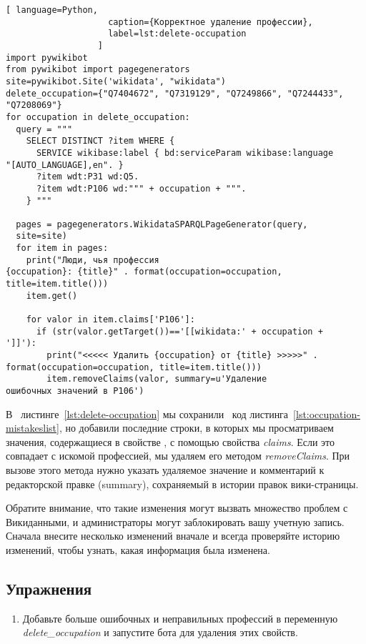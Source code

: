 \begin{lstlisting}[ language=Python,
                    caption={Корректное удаление профессии},
                    label=lst:delete-occupation
                  ]
import pywikibot
from pywikibot import pagegenerators
site=pywikibot.Site('wikidata', "wikidata")
delete_occupation={"Q7404672", "Q7319129", "Q7249866", "Q7244433", 
"Q7208069"}
for occupation in delete_occupation:
  query = """
    SELECT DISTINCT ?item WHERE {
      SERVICE wikibase:label { bd:serviceParam wikibase:language 
"[AUTO_LANGUAGE],en". }
      ?item wdt:P31 wd:Q5.
      ?item wdt:P106 wd:""" + occupation + """.
    } """

  pages = pagegenerators.WikidataSPARQLPageGenerator(query, 
  site=site)
  for item in pages:
    print("Люди, чья профессия 
{occupation}: {title}" . format(occupation=occupation, 
title=item.title()))
    item.get()

    for valor in item.claims['P106']:
      if (str(valor.getTarget())=='[[wikidata:' + occupation + 
']]'):
        print("<<<<< Удалить {occupation} от {title} >>>>>" . 
format(occupation=occupation, title=item.title()))
        item.removeClaims(valor, summary=u'Удаление 
ошибочных значений в P106')
\end{lstlisting} 

В ~листинге~\ref{lst:delete-occupation} мы сохранили ~код листинга~\ref{lst:occupation-mistakeslist}, но добавили последние строки, в которых мы просматриваем значения, содержащиеся в свойстве , с помощью свойства \textit{claims}. Если это совпадает с искомой профессией, мы удаляем его методом \textit{removeClaims}. При вызове этого метода нужно указать удаляемое значение и комментарий к редакторской правке (summary), сохраняемый в истории правок вики-страницы.

Обратите внимание, что такие изменения могут вызвать множество проблем с Викиданными, и администраторы могут заблокировать вашу учетную запись. Сначала внесите несколько изменений вначале и всегда проверяйте историю изменений, чтобы узнать, какая информация была изменена.

\subsection{Упражнения}

\begin{enumerate} 
\item Добавьте больше ошибочных и неправильных профессий в переменную \textit{delete\_occupation} и запустите бота для удаления этих свойств.
\end{enumerate}